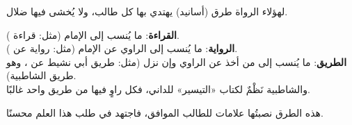 \begin{mufradat}
\end{mufradat}
\maana لهؤلاء الرواة طرق (أسانيد) يهتدي بها كل طالب، ولا يُخشى فيها ضلال.

\begin{qaida}
\textbf{القراءة}: ما يُنسب إلى الإمام (مثل: قراءة \Nafi).\\
\textbf{الرواية}: ما يُنسب إلى الراوي عن الإمام (مثل: رواية \Qalun{} عن \Nafi).\\
\textbf{الطريق}: ما يُنسب إلى من أخذ عن الراوي وإن نزل (مثل: طريق أبي نشيط عن \Qalun، وهو طريق الشاطبية).\\
والشاطبية نَظْمٌ لكتاب «التيسير» للداني، فكل راوٍ فيها من طريق واحد غالبًا.
\end{qaida}

\begin{mufradat}
\end{mufradat}
\maana هذه الطرق نصبتُها علامات للطالب الموافق، فاجتهد في طلب هذا العلم محسنًا.
